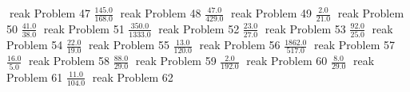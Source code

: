 \documentclass{article}
\begin{document}
\hfill reak
Problem 47
\newline
\hfill \break
$\displaystyle \frac{145.0}{168.0}$
\newline
\hfill reak
Problem 48
\newline
\hfill \break
$\displaystyle \frac{47.0}{429.0}$
\newline
\hfill reak
Problem 49
\newline
\hfill \break
$\displaystyle \frac{2.0}{21.0}$
\newline
\hfill reak
Problem 50
\newline
\hfill \break
$\displaystyle \frac{41.0}{38.0}$
\newline
\hfill reak
Problem 51
\newline
\hfill \break
$\displaystyle \frac{350.0}{1333.0}$
\newline
\hfill reak
Problem 52
\newline
\hfill \break
$\displaystyle \frac{23.0}{27.0}$
\newline
\hfill reak
Problem 53
\newline
\hfill \break
$\displaystyle \frac{92.0}{25.0}$
\newline
\hfill reak
Problem 54
\newline
\hfill \break
$\displaystyle \frac{22.0}{19.0}$
\newline
\hfill reak
Problem 55
\newline
\hfill \break
$\displaystyle \frac{13.0}{120.0}$
\newline
\hfill reak
Problem 56
\newline
\hfill \break
$\displaystyle \frac{1862.0}{517.0}$
\newline
\hfill reak
Problem 57
\newline
\hfill \break
$\displaystyle \frac{16.0}{5.0}$
\newline
\hfill reak
Problem 58
\newline
\hfill \break
$\displaystyle \frac{88.0}{29.0}$
\newline
\hfill reak
Problem 59
\newline
\hfill \break
$\displaystyle \frac{2.0}{192.0}$
\newline
\hfill reak
Problem 60
\newline
\hfill \break
$\displaystyle \frac{8.0}{29.0}$
\newline
\hfill reak
Problem 61
\newline
\hfill \break
$\displaystyle \frac{11.0}{104.0}$
\newline
\hfill reak
Problem 62
\newline
\end{document}
